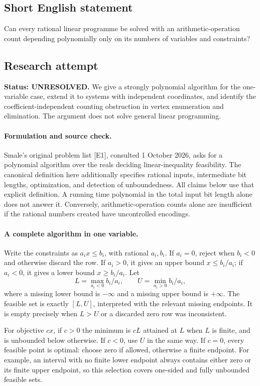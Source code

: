 \documentclass[11pt,a4paper]{article}
\begin{document}
\subsection{Short English statement}

Can every rational linear programme be solved with an arithmetic-operation count depending polynomially only on its numbers of variables and constraints?

\subsection{Research attempt}
\textbf{Status: UNRESOLVED.} We give a strongly polynomial algorithm for the one-variable case, extend it to systems with independent coordinates, and identify the coefficient-independent counting obstruction in vertex enumeration and elimination. The argument does not solve general linear programming.

\paragraph{Formulation and source check.}
Smale's original problem list [E1], consulted 1 October 2026, asks for a polynomial algorithm over the reals deciding linear-inequality feasibility. The canonical definition here additionally specifies rational inputs, intermediate bit lengths, optimization, and detection of unboundedness. All claims below use that explicit definition. A running time polynomial in the total input bit length alone does not answer it. Conversely, arithmetic-operation counts alone are insufficient if the rational numbers created have uncontrolled encodings.

\paragraph{A complete algorithm in one variable.}
Write the constraints as $a_ix\le b_i$, with rational $a_i,b_i$. If $a_i=0$, reject when $b_i<0$ and otherwise discard the row. If $a_i>0$, it gives an upper bound $x\le b_i/a_i$; if $a_i<0$, it gives a lower bound $x\ge b_i/a_i$. Let
\[
L=\max_{a_i<0} b_i/a_i,\qquad U=\min_{a_i>0} b_i/a_i,
\]
where a missing lower bound is $-\infty$ and a missing upper bound is $+\infty$. The feasible set is exactly $[L,U]$, interpreted with the relevant missing endpoints. It is empty precisely when $L>U$ or a discarded zero row was inconsistent.

For objective $cx$, if $c>0$ the minimum is $cL$ attained at $L$ when $L$ is finite, and is unbounded below otherwise. If $c<0$, use $U$ in the same way. If $c=0$, every feasible point is optimal: choose zero if allowed, otherwise a finite endpoint. For example, an interval with no finite lower endpoint always contains either zero or its finite upper endpoint, so this selection covers one-sided and fully unbounded feasible sets.
\end{document}
